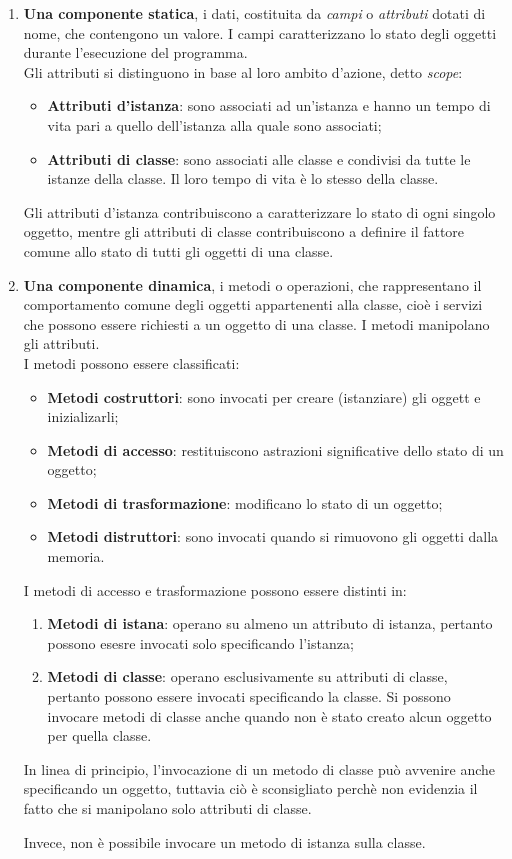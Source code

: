 \documentclass[12pt]{report}
\begin{document}
\begin{enumerate}
	\item \textbf{Una componente statica}, i dati, costituita da \textit{campi} o \textit{attributi} dotati di nome, che contengono un valore. I campi caratterizzano lo stato degli oggetti durante l'esecuzione del programma. \\
	Gli attributi si distinguono in base al loro ambito d'azione, detto \textit{scope}:
	\begin{itemize}
		\item \textbf{Attributi d'istanza}: sono associati ad un'istanza e hanno un tempo di vita pari a quello dell'istanza alla quale sono associati;
		\item \textbf{Attributi di classe}: sono associati alle classe e condivisi da tutte le istanze della classe. Il loro tempo di vita è lo stesso della classe.
	\end{itemize}
	Gli attributi d'istanza contribuiscono a caratterizzare lo stato di ogni singolo oggetto, mentre gli attributi di classe contribuiscono a definire il fattore comune allo stato di tutti gli oggetti di una classe.
	\item \textbf{Una componente dinamica}, i metodi o  operazioni, che rappresentano il comportamento comune degli oggetti appartenenti alla classe, cioè i servizi che possono essere richiesti a un oggetto di una classe. I metodi manipolano gli attributi. \\
	I metodi possono essere classificati:
	\begin{itemize}
		\item \textbf{Metodi costruttori}: sono invocati per creare (istanziare) gli oggett e inizializarli;
		\item \textbf{Metodi di accesso}: restituiscono astrazioni significative dello stato di un oggetto;
		\item \textbf{Metodi di trasformazione}: modificano lo stato di un oggetto;
		\item \textbf{Metodi distruttori}: sono invocati quando si rimuovono gli oggetti dalla memoria.
	\end{itemize}
	I metodi di accesso e trasformazione possono essere distinti in:
	\begin{enumerate}
		\item \textbf{Metodi di istana}: operano su almeno un attributo di istanza, pertanto possono esesre invocati solo specificando l'istanza;
		\item \textbf{Metodi di classe}: operano esclusivamente su attributi di classe, pertanto possono essere invocati specificando la classe. Si possono invocare metodi di classe anche quando non è stato creato alcun oggetto per quella classe.
	\end{enumerate}
	In linea di principio, l'invocazione di un metodo di classe può avvenire anche specificando un oggetto, tuttavia ciò è sconsigliato perchè non evidenzia il fatto che si manipolano solo attributi di classe.

	Invece, non è possibile invocare un metodo di istanza sulla classe.
\end{enumerate}
\end{document}
